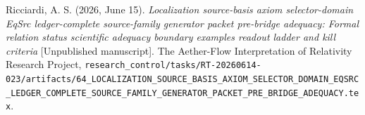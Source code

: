 \documentclass[11pt]{article}
\begin{document}
Ricciardi, A. S. (2026, June 15). \emph{Localization source-basis axiom
selector-domain EqSrc ledger-complete source-family generator packet
pre-bridge adequacy: Formal relation status scientific adequacy
boundary examples readout ladder and kill criteria} [Unpublished
manuscript]. The Aether-Flow Interpretation of Relativity Research
Project,
\texttt{research\_control/tasks/RT-20260614-023/artifacts/64\_LOCALIZATION\_SOURCE\_BASIS\_AXIOM\_SELECTOR\_DOMAIN\_EQSRC\_LEDGER\_COMPLETE\_SOURCE\_FAMILY\_GENERATOR\_PACKET\_PRE\_BRIDGE\_ADEQUACY.tex}.
\end{document}
